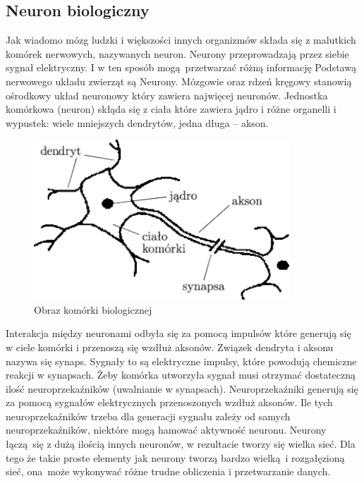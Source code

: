 \documentclass{article}
\begin{document}
\subsection{Neuron biologiczny}

Jak wiadomo mózg ludzki i większości innych organizmów składa się z malutkich komórek nerwowych, nazywanych neuron. Neurony przeprowadzają przez siebie sygnał elektryczny. I w ten sposób mogą przetwarzać różną informację Podstawą nerwowego układu zwierząt są Neurony. Mózgowie oraz rdzeń kręgowy stanowią ośrodkowy układ neuronowy który zawiera najwięcej neuronów. \cite{neuroscience}
Jednostka komórkowa (neuron) skłąda się z ciała które zawiera jądro i różne organelli i wypustek: wiele mniejszych dendrytów, jedna długa -- akson. \cite{geron}

\begin{figure}[H]
	\centering
	\includegraphics[width=\textwidth,height=6cm,keepaspectratio=true]{neuron_bio}
	\caption{
		Obraz komórki biologicznej \cite{neuron_bio}
	}
\end{figure}

Interakcja między neuronami odbyła się za pomocą impulsów które generują się w ciele komórki i przenoszą się  wzdłuż aksonów. Związek dendryta i aksonu nazywa się synaps. Sygnały to są elektryczne impulsy, które powodują chemiczne reakcji w synapsach. Żeby komórka utworzyła sygnał musi otrzymać dostateczną ilość neuroprzekaźników (uwalnianie w synapsach). Neuroprzekaźniki generują się za pomocą sygnałów elektrycznych przenoszonych wzdłuż aksonów. Ile tych neuroprzekaźników trzeba dla generacji sygnału zależy od samych neuroprzekaźników, niektóre mogą hamować aktywność neuronu.\cite{geron}
Neurony łączą się z dużą ilością innych neuronów, w rezultacie tworzy się wielka sieć. Dla tego że takie proste elementy jak neurony tworzą bardzo wielką i rozgałęzioną sieć, ona może wykonywać różne trudne obliczenia i przetwarzanie danych.\cite{geron}
\end{document}
